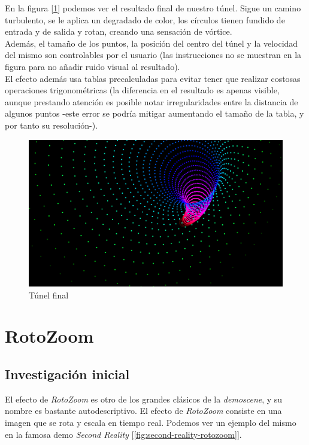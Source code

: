En la figura [\ref{fig:finaltunnel}] podemos ver el resultado final de nuestro túnel. Sigue un camino turbulento, se le aplica un degradado de color, los círculos tienen fundido de entrada y de salida y rotan, creando una sensación de vórtice.\\

Además, el tamaño de los puntos, la posición del centro del túnel y la velocidad del mismo son controlables por el usuario (las instrucciones no se muestran en la figura para no añadir ruido visual al resultado).\\
 
El efecto además usa tablas precalculadas para evitar tener que realizar costosas operaciones trigonométricas (la diferencia en el resultado es apenas visible, aunque prestando atención es posible notar irregularidades entre la distancia de algunos puntos -este error se podría mitigar aumentando el tamaño de la tabla, y por tanto su resolución-). 

\begin{figure}[h]
	\centering
	\includegraphics[width=12cm]{archivos/finaltunnel}
	\caption{Túnel final}
	\label{fig:finaltunnel}
\end{figure}

\section{RotoZoom} \label{sec:rotozoom}

\subsection{Investigación inicial}

El efecto de \emph{RotoZoom} es otro de los grandes clásicos de la \emph{demoscene}, y su nombre es bastante autodescriptivo. El efecto de \emph{RotoZoom} consiste en una imagen que se rota y escala en tiempo real. Podemos ver un ejemplo del mismo en la famosa demo \emph{Second Reality} [\ref{fig:second-reality-rotozoom}].\\

